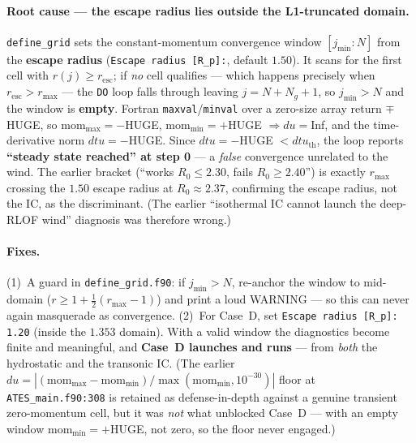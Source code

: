 \documentclass[english,a4paper]{kiseon_memo}
\begin{document}
\paragraph{Root cause --- the escape radius lies outside the L1-truncated domain.}
\texttt{define\_grid} sets the constant-momentum convergence window \([j_{\min}:N]\)
from the \textbf{escape radius} (\texttt{Escape radius [R\_p]:}, default \(1.50\)). It
scans for the first cell with \(r(j)\ge r_{\mathrm{esc}}\); if \emph{no} cell qualifies
--- which happens precisely when \(r_{\mathrm{esc}}>r_{\max}\) --- the \texttt{DO} loop
falls through leaving \(j=N+N_g+1\), so \(j_{\min}>N\) and the window is \textbf{empty}.
Fortran \texttt{maxval}/\texttt{minval} over a zero-size array return \(\mp\)HUGE, so
\(\mathrm{mom_{max}}=-\)HUGE, \(\mathrm{mom_{min}}=+\)HUGE \(\Rightarrow du=\)Inf, and
the time-derivative norm \(dtu=-\)HUGE. Since \(dtu=-\)HUGE \(<dtu_{\mathrm{th}}\), the
loop reports \textbf{``steady state reached'' at step 0} --- a \emph{false} convergence
unrelated to the wind. The earlier bracket (``works \(R_0\le2.30\), fails
\(R_0\ge2.40\)'') is exactly \(r_{\max}\) crossing the \(1.50\) escape radius at
\(R_0\approx2.37\), confirming the escape radius, not the IC, as the discriminant. (The
earlier ``isothermal IC cannot launch the deep-RLOF wind'' diagnosis was therefore
wrong.)

\paragraph{Fixes.} (1)~A guard in \texttt{define\_grid.f90}: if \(j_{\min}>N\),
re-anchor the window to mid-domain (\(r\ge1+\tfrac12(r_{\max}-1)\)) and print a loud
WARNING --- so this can never again masquerade as convergence. (2)~For Case~D, set
\texttt{Escape radius [R\_p]: 1.20} (inside the \(1.353\) domain). With a valid window
the diagnostics become finite and meaningful, and \textbf{Case~D launches and runs} ---
from \emph{both} the hydrostatic and the transonic IC. (The earlier
\(du=|(\mathrm{mom_{max}}-\mathrm{mom_{min}})/\max(\mathrm{mom_{min}},10^{-30})|\) floor at
\texttt{ATES\_main.f90:308} is retained as defense-in-depth against a genuine transient
zero-momentum cell, but it was \emph{not} what unblocked Case~D --- with an empty window
\(\mathrm{mom_{min}}=+\)HUGE, not zero, so the floor never engaged.)
\end{document}
